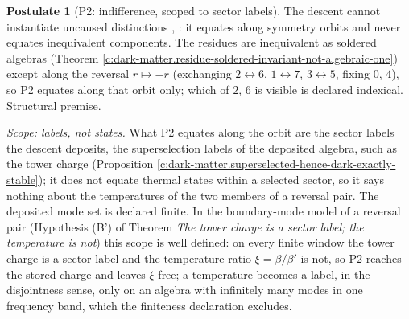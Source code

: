 \documentclass[11pt]{article}
\theoremstyle{definition}
\newtheorem{postulate}[theorem]{Postulate}
\theoremstyle{plain}
\newcommand{\changedmark}[2]{\marginpar{\raggedright\scriptsize\color{#1}#2}}
\begin{document}
\begin{postulate}[P2: indifference, scoped to sector labels]\label{c:dark-matter.p2-indifference}
\changedmark{BurntOrange}{changed since the deposit}
The descent cannot instantiate uncaused distinctions \cite[Principle~5.4]{ButlerT8}, \cite[\S2]{ButlerT13}: it equates along symmetry orbits and never equates inequivalent components. The residues are inequivalent as soldered algebras (Theorem \ref{c:dark-matter.residue-soldered-invariant-not-algebraic-one}) except along the reversal $r \mapsto -r$ (exchanging $2 \leftrightarrow 6$, $1 \leftrightarrow 7$, $3 \leftrightarrow 5$, fixing $0$, $4$), so P2 equates along that orbit only; which of $2$, $6$ is visible is declared indexical. Structural premise.

\emph{Scope: labels, not states.} What P2 equates along the orbit are the sector labels the descent deposits, the superselection labels of the deposited algebra, such as the tower charge (Proposition \ref{c:dark-matter.superselected-hence-dark-exactly-stable}); it does not equate thermal states within a selected sector, so it says nothing about the temperatures of the two members of a reversal pair. The deposited mode set is declared finite. In the boundary-mode model of a reversal pair (Hypothesis (B') of Theorem \emph{The tower charge is a sector label; the temperature is not}) this scope is well defined: on every finite window the tower charge is a sector label and the temperature ratio $\xi = \beta/\beta'$ is not, so P2 reaches the stored charge and leaves $\xi$ free; a temperature becomes a label, in the disjointness sense, only on an algebra with infinitely many modes in one frequency band, which the finiteness declaration excludes.
\end{postulate}
\end{document}
